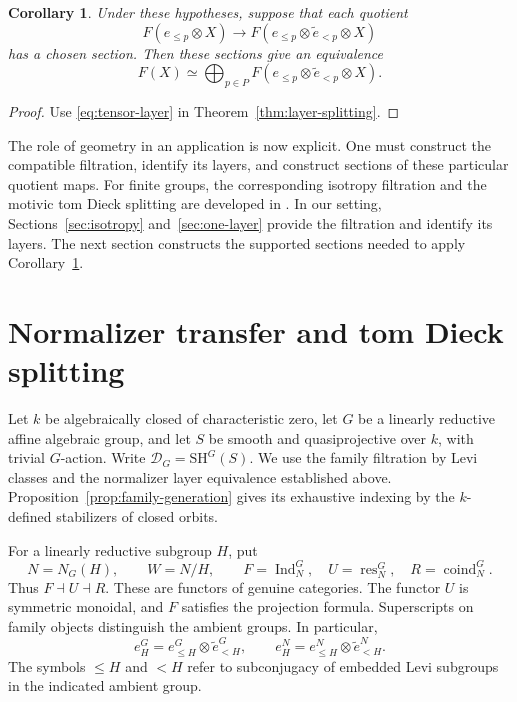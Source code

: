 \documentclass[11pt,reqno]{amsart}
\newtheorem{corollary}[theorem]{Corollary}
\theoremstyle{definition}
\theoremstyle{remark}
\theoremstyle{plain}
\numberwithin{equation}{section}
\newcommand{\SH}{\mathrm{SH}}
\newcommand{\D}{\mathcal D}
\begin{document}
\begin{corollary}
\label{cor:tensor-layer-splitting}
Under these hypotheses, suppose that each quotient
\[
 F(e_{\leq p}\otimes X)
 \longrightarrow
 F(e_{\leq p}\otimes\widetilde e_{<p}\otimes X)
\]
has a chosen section.
Then these sections give an equivalence
\[
 F(X)\simeq
 \bigoplus_{p\in P}
 F(e_{\leq p}\otimes\widetilde e_{<p}\otimes X).
\]
\end{corollary}

\begin{proof}
Use \eqref{eq:tensor-layer} in
Theorem~\ref{thm:layer-splitting}.
\end{proof}

The role of geometry in an application is now explicit.
One must construct the compatible filtration, identify its layers,
and construct sections of these particular quotient maps.
For finite groups, the corresponding isotropy filtration and the
motivic tom Dieck splitting are developed in
\cite[Sections 3 and 7, especially Theorem 7.4]{GH}.
In our setting, Sections~\ref{sec:isotropy} and~\ref{sec:one-layer}
provide the filtration and identify its layers.
The next section constructs the supported sections needed to apply
Corollary~\ref{cor:tensor-layer-splitting}.


\section{Normalizer transfer and tom Dieck splitting}
\label{sec:td-splitting}

Let \(k\) be algebraically closed of characteristic zero, let \(G\) be a
linearly reductive affine algebraic group, and let \(S\) be smooth and
quasiprojective over \(k\), with trivial \(G\)-action.
Write \(\D_G=\SH^G(S)\).
We use the family filtration by Levi classes and the normalizer
layer equivalence established above.
Proposition~\ref{prop:family-generation} gives its exhaustive indexing
by the \(k\)-defined stabilizers of closed orbits.

For a linearly reductive subgroup \(H\), put
\[
 N=N_G(H),\qquad W=N/H,\qquad
 F=\operatorname{Ind}_N^G,\quad U=\operatorname{res}_N^G,\quad R=\operatorname{coind}_N^G.
\]
Thus \(F\dashv U\dashv R\). These are functors of genuine categories.
The functor \(U\) is symmetric monoidal, and \(F\) satisfies the
projection formula. Superscripts on family objects distinguish the
ambient groups. In particular,
\[
 e_H^G=e_{\le H}^G\otimes\widetilde e_{<H}^G,\qquad
 e_H^N=e_{\le H}^N\otimes\widetilde e_{<H}^N.
\]
The symbols \(\le H\) and \(<H\) refer to subconjugacy of embedded
Levi subgroups in the indicated ambient group.
\end{document}
